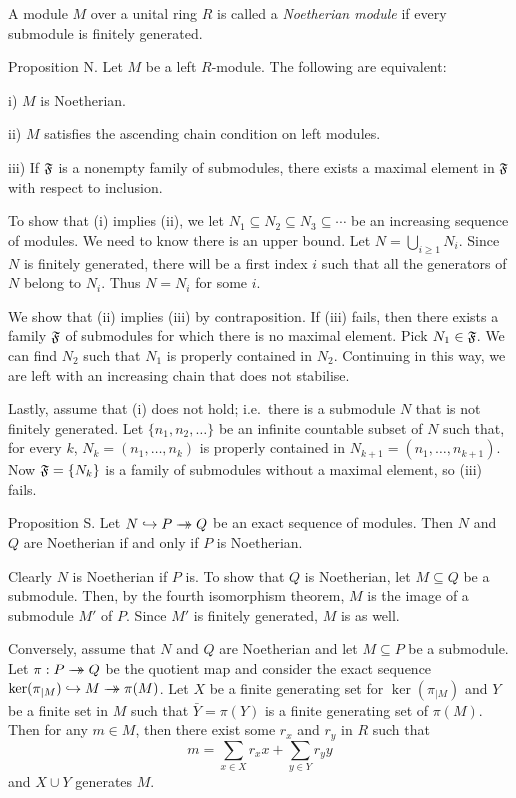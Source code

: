 A module $M$ over a unital ring $R$ is called a {\it Noetherian module} if every submodule is finitely generated.

\proclaim Proposition N. Let $M$ be a left $R$-module. The following are equivalent:
\medskip
\item{i)} $M$ is Noetherian.
\smallskip
\item{ii)} $M$ satisfies the ascending chain condition on left modules.
\smallskip
\item{iii)} If $\frak F$ is a nonempty family of submodules, there exists a maximal element in $\frak F$ with respect to inclusion.
\medskip

\proof To show that (i) implies (ii), we let $N_1\subseteq N_2 \subseteq N_3 \subseteq \cdots$ be an increasing sequence of modules. We need to know there is an upper bound. Let $N = \bigcup_{i\geq 1} N_i$. Since $N$ is finitely generated, there will be a first index $i$ such that all the generators of $N$ belong to $N_i$. Thus $N = N_i$ for some $i$.

We show that (ii) implies (iii) by contraposition. If (iii) fails, then there exists a family $\frak F$ of submodules for which there is no maximal element. Pick $N_1\in \frak F$. We can find $N_2$ such that $N_1$ is properly contained in $N_2$. Continuing in this way, we are left with an increasing chain that does not stabilise.

Lastly, assume that (i) does not hold; i.e.\ there is a submodule $N$ that is not finitely generated. Let $\{n_1,n_2,\ldots\}$ be an infinite countable subset of $N$ such that, for every $k$, $N_k = (n_1,\ldots,n_k)$ is properly contained in $N_{k+1} = (n_1,\ldots,n_{k+1})$. Now $\frak F = \{N_k\}$ is a family of submodules without a maximal element, so (iii) fails.\slug

\proclaim Proposition S. Let $N \hookrightarrow P\rightarrow\!\!\!\!\!\rightarrow Q$ be an exact sequence of modules. Then $N$ and $Q$ are Noetherian if and only if $P$ is Noetherian.

\proof Clearly $N$ is Noetherian if $P$ is. To show that $Q$ is Noetherian, let $M\subseteq Q$ be a submodule. Then, by the fourth isomorphism theorem, $M$ is the image of a submodule $M'$ of $P$. Since $M'$ is finitely generated, $M$ is as well.

Conversely, assume that $N$ and $Q$ are Noetherian and let $M\subseteq P$ be a submodule. Let $\pi:P\rightarrow\!\!\!\!\!\rightarrow Q$ be the quotient map and consider the exact sequence $\ker(\pi_{|M})\hookrightarrow M\rightarrow\!\!\!\!\!\rightarrow \pi(M)$. Let $X$ be a finite generating set for $\ker(\pi_{|M})$ and $Y$ be a finite set in $M$ such that $\bar Y = \pi(Y)$ is a finite generating set of $\pi(M)$. Then for any $m\in M$, then there exist some $r_x$ and $r_y$ in $R$ such that
$$m = \sum_{x\in X} r_x x + \sum_{y\in Y} r_y y$$
and $X\cup Y$ generates $M$.\slug

